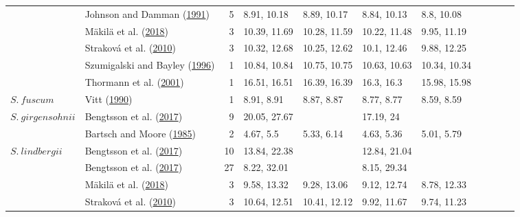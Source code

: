 \documentclass[
  12pt,
]{article}
\begin{document}
\begin{table}[H]
{\begin{tabular}[t]{llrllllllll}
 & Johnson and Damman (\protect\hyperlink{ref-Johnson.1991}{1991}) & 5 & 8.91, 10.18 & 8.89, 10.17 & 8.84, 10.13 & 8.8, 10.08 &  &  &  & \\

 & Mäkilä et al. (\protect\hyperlink{ref-Makila.2018}{2018}) & 3 & 10.39, 11.69 & 10.28, 11.59 & 10.22, 11.48 & 9.95, 11.19 &  &  &  & \\

 & Straková et al. (\protect\hyperlink{ref-Strakova.2010}{2010}) & 3 & 10.32, 12.68 & 10.25, 12.62 & 10.1, 12.46 & 9.88, 12.25 &  &  &  & \\

 & Szumigalski and Bayley (\protect\hyperlink{ref-Szumigalski.1996}{1996}) & 1 & 10.84, 10.84 & 10.75, 10.75 & 10.63, 10.63 & 10.34, 10.34 &  &  &  & \\

 & Thormann et al. (\protect\hyperlink{ref-Thormann.2001}{2001}) & 1 & 16.51, 16.51 & 16.39, 16.39 & 16.3, 16.3 & 15.98, 15.98 &  &  &  & \\

\multirow[t]{-10}{*}{\raggedright\arraybackslash $S.~fuscum$} & Vitt (\protect\hyperlink{ref-Vitt.1990}{1990}) & 1 & 8.91, 8.91 & 8.87, 8.87 & 8.77, 8.77 & 8.59, 8.59 &  &  &  & \\
\cmidrule{1-11}
$S.~girgensohnii$ & Bengtsson et al. (\protect\hyperlink{ref-Bengtsson.2017}{2017}) & 9 & 20.05, 27.67 &  & 17.19, 24 &  &  &  &  & \\
\cmidrule{1-11}
 & Bartsch and Moore (\protect\hyperlink{ref-Bartsch.1985}{1985}) & 2 & 4.67, 5.5 & 5.33, 6.14 & 4.63, 5.36 & 5.01, 5.79 &  &  &  & \\

\multirow[t]{-2}{*}{\raggedright\arraybackslash $S.~lindbergii$} & Bengtsson et al. (\protect\hyperlink{ref-Bengtsson.2017}{2017}) & 10 & 13.84, 22.38 &  & 12.84, 21.04 &  &  &  &  & \\
\cmidrule{1-11}
 & Bengtsson et al. (\protect\hyperlink{ref-Bengtsson.2017}{2017}) & 27 & 8.22, 32.01 &  & 8.15, 29.34 &  &  &  &  & \\

 & Mäkilä et al. (\protect\hyperlink{ref-Makila.2018}{2018}) & 3 & 9.58, 13.32 & 9.28, 13.06 & 9.12, 12.74 & 8.78, 12.33 &  &  &  & \\

 & Straková et al. (\protect\hyperlink{ref-Strakova.2010}{2010}) & 3 & 10.64, 12.51 & 10.41, 12.12 & 9.92, 11.67 & 9.74, 11.23 &  &  &  & \\


\end{tabular}}
\end{table}
\end{document}

